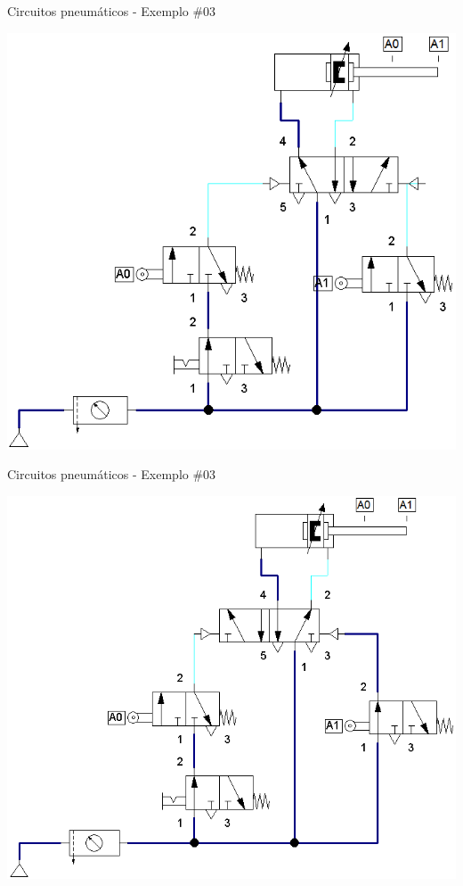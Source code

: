 \begin{frame}{Circuitos pneumáticos - Exemplo \#03}
	
	\centering
	\includegraphics[width=0.7\linewidth]{Figuras/Ch14/fig47n4}
	
\end{frame}


\begin{frame}{Circuitos pneumáticos - Exemplo \#03}
	
	\centering
	\includegraphics[width=0.7\linewidth]{Figuras/Ch14/fig47n5}
	
\end{frame}


